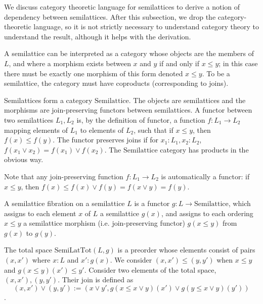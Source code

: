 \documentclass{article}
\begin{document}
      We discuss category theoretic language for semilattices to derive a notion of dependency between semilattices. After this subsection, we drop the category-theoretic language, so it is not strictly necessary to understand category theory to understand the result, although it helps with the derivation.

      A semilattice can be interpreted as a category whose objects are the members of $L$, and where a morphism exists between $x$ and $y$ if and only if $x \leq y$; in this case there must be exactly one morphism of this form denoted $x \leq y$. To be a semilattice, the category must have coproducts (corresponding to joins).

      Semilattices form a category $\mathrm{Semilattice}$.  The objects are semilattices and the morphisms are join-preserving functors between semilattices. A functor between two semilattices $L_1, L_2$ is, by the definition of functor, a function $f: L_1 \rightarrow L_2$ mapping elements of $L_1$ to elements of $L_2$, such that if $x \leq y$, then $f(x) \leq f(y)$. The functor preserves joins if for $x_1 : L_1, x_2 : L_2$, $f(x_1 \vee x_2) = f(x_1) \vee f(x_2)$. The $\mathrm{Semilattice}$ category has products in the obvious way.

      Note that any join-preserving function $f : L_1 \rightarrow L_2$ is automatically a functor: if $x \leq y$, then $f(x) \leq f(x) \vee f(y) = f(x \vee y) = f(y)$. 

      A semilattice fibration on a semilattice $L$ is a functor $g : L \rightarrow \mathrm{Semilattice}$, which assigns to each element $x$ of $L$ a semilattice $g(x)$, and assigns to each ordering $x \leq y$ a semilattice morphism (i.e. join-preserving functor) $g(x \leq y)$ from $g(x)$ to $g(y)$.

      The total space $\mathrm{SemiLatTot}(L, g)$ is a preorder whose elements consist of pairs $(x, x')$ where $x : L$ and $x' : g(x)$. We consider $(x, x') \leq (y, y')$ when $x \leq y$ and $g(x \leq y)(x') \leq y'$. Consider two elements of the total space, $(x, x'), (y, y')$. Their join is defined as $$(x, x') \vee (y, y') := (x \vee y', g(x \leq x \vee y)(x') \vee g(y \leq x \vee y)(y'))$$. 
\end{document}
